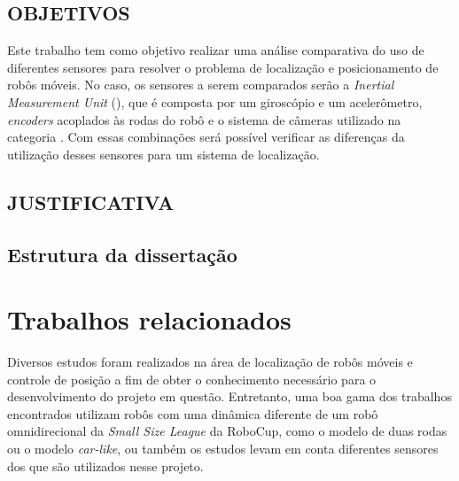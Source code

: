 \documentclass[acronym, symbols, table]{fei}
\begin{document}
	\section{OBJETIVOS}
	
		Este trabalho tem como objetivo realizar uma análise comparativa do uso de diferentes sensores para resolver o problema de localização e posicionamento de robôs móveis. No caso, os sensores a serem comparados serão a \textit{Inertial Measurement Unit} (), que é composta por um giroscópio e um acelerômetro, \textit{encoders} acoplados às rodas do robô e o sistema de câmeras utilizado na categoria . Com essas combinações será possível verificar as diferenças da utilização desses sensores para um sistema de localização.
	
%		
%		
%		
		
	\section{JUSTIFICATIVA}
	
	\section{Estrutura da dissertação}
		
\chapter{Trabalhos relacionados}\label{sec:trab_relacionados}
	Diversos estudos foram realizados na área de localização de robôs móveis e controle de posição a fim de obter o conhecimento necessário para o desenvolvimento do projeto em questão. Entretanto, uma boa gama dos trabalhos encontrados utilizam robôs com uma dinâmica diferente de um robô omnidirecional da \textit{Small Size League} da RoboCup, como o modelo de duas rodas ou o modelo \textit{car-like}, ou também os estudos levam em conta diferentes sensores dos que são utilizados nesse projeto.
	
\end{document}
